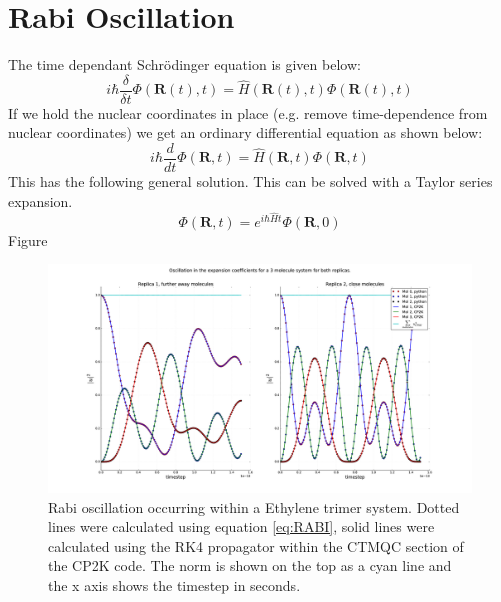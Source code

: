 \chapter{Rabi Oscillation \label{ap:Rabi}}
The time dependant Schr\"odinger equation is given below:
\begin{equation}
	i \hbar \frac{\delta}{\delta t} \Phi(\mathbf{R}(t), t) = \hat{H}(\mathbf{R}(t), t) \Phi(\mathbf{R}(t), t)
\end{equation}
If we hold the nuclear coordinates in place (e.g. remove time-dependence from nuclear coordinates) we get an ordinary differential equation as shown below:
\begin{equation}
	i \hbar \frac{d}{d t} \Phi(\mathbf{R}, t) = \hat{H}(\mathbf{R}, t) \Phi(\mathbf{R}, t)
	\label{eq:RABI}
\end{equation}
This has the following general solution. This can be solved with a Taylor series expansion.
\[\Phi(\mathbf{R}, t) = e^{i \hbar \hat{H}t} \Phi(\mathbf{R}, 0)\]
Figure 
\begin{figure}[ht]
  \includegraphics[width=\textwidth]{./img/CTMQC/3_mols_with_python_sol_2_rep.png}
  \caption{\label{fig:Rabi}Rabi oscillation occurring within a Ethylene trimer system. Dotted lines were calculated using equation \eqref{eq:RABI}, solid lines were calculated using the RK4 propagator within the CTMQC section of the CP2K code. The norm is shown on the top as a cyan line and the x axis shows the timestep in seconds.}
\end{figure}









